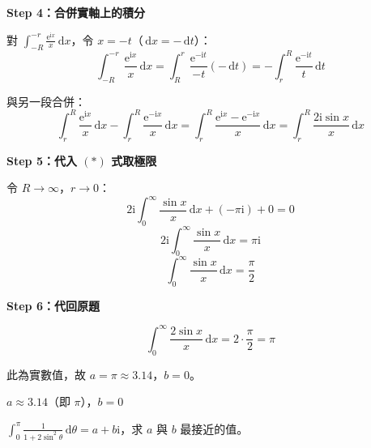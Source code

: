 \documentclass[12pt,a4paper]{article}
\newcommand{\dd}{\,\mathrm{d}}
\newcommand{\ii}{\mathrm{i}}
\newcommand{\ee}{\mathrm{e}}
\begin{document}
\begin{solbox}[解]
\textbf{Step 4：合併實軸上的積分}

對 $\displaystyle\int_{-R}^{-r}\frac{\ee^{\ii x}}{x}\dd{x}$，令 $x=-t$（$\dd{x}=-\dd{t}$）：
$$\int_{-R}^{-r}\frac{\ee^{\ii x}}{x}\dd{x}=\int_R^r\frac{\ee^{-\ii t}}{-t}(-\dd{t})=-\int_r^R\frac{\ee^{-\ii t}}{t}\dd{t}$$

與另一段合併：
$$\int_r^R\frac{\ee^{\ii x}}{x}\dd{x}-\int_r^R\frac{\ee^{-\ii x}}{x}\dd{x}=\int_r^R\frac{\ee^{\ii x}-\ee^{-\ii x}}{x}\dd{x}=\int_r^R\frac{2\ii\sin x}{x}\dd{x}$$

\textbf{Step 5：代入 $(*)$ 式取極限}

令 $R\to\infty$，$r\to 0$：
$$2\ii\int_0^{\infty}\frac{\sin x}{x}\dd{x}+(-\pi\ii)+0=0$$
$$2\ii\int_0^{\infty}\frac{\sin x}{x}\dd{x}=\pi\ii$$
$$\boxed{\int_0^{\infty}\frac{\sin x}{x}\dd{x}=\frac{\pi}{2}}$$

\textbf{Step 6：代回原題}

$$\int_0^{\infty}\frac{2\sin x}{x}\dd{x}=2\cdot\frac{\pi}{2}=\pi$$

此為實數值，故 $a=\pi\approx 3.14$，$b=0$。
\end{solbox}

\begin{ansbox}
$a\approx\boxed{3.14}$（即 $\pi$），$b=\boxed{0}$
\end{ansbox}

\begin{qbox}[第 10 題]
$\displaystyle\int_0^{\pi}\frac{1}{1+2\sin^2\theta}\dd{\theta}=a+b\ii$，求 $a$ 與 $b$ 最接近的值。
\end{qbox}
\end{document}
